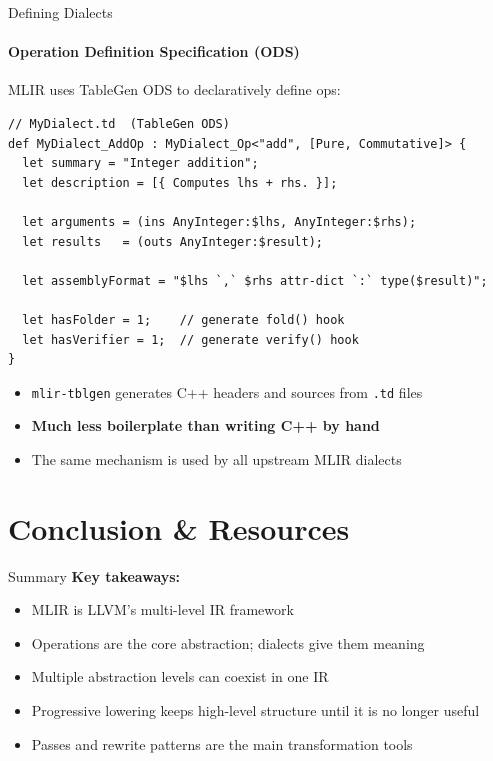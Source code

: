\begin{frame}[fragile]{Defining Dialects}
  \framesubtitle{Operation Definition Specification (ODS)}
  MLIR uses TableGen ODS to declaratively define ops:

\begin{lstlisting}[language=none,basicstyle=\ttfamily\scriptsize]
// MyDialect.td  (TableGen ODS)
def MyDialect_AddOp : MyDialect_Op<"add", [Pure, Commutative]> {
  let summary = "Integer addition";
  let description = [{ Computes lhs + rhs. }];

  let arguments = (ins AnyInteger:$lhs, AnyInteger:$rhs);
  let results   = (outs AnyInteger:$result);

  let assemblyFormat = "$lhs `,` $rhs attr-dict `:` type($result)";

  let hasFolder = 1;    // generate fold() hook
  let hasVerifier = 1;  // generate verify() hook
}
\end{lstlisting}

  \begin{itemize}
    \item \texttt{mlir-tblgen} generates C++ headers and sources from
          \texttt{.td} files
    \item \textbf{\textcolor{mainAccent}{Much less boilerplate than writing C++ by hand}}
    \item The same mechanism is used by all upstream MLIR dialects
  \end{itemize}
\end{frame}


\section{Conclusion \& Resources}


\begin{frame}{Summary}
  \textbf{Key takeaways:}
  \begin{itemize}
    \item MLIR is LLVM's multi-level IR framework
    \item Operations are the core abstraction; dialects give them meaning
    \item Multiple abstraction levels can coexist in one IR
    \item Progressive lowering keeps high-level structure until it is no longer useful
    \item Passes and rewrite patterns are the main transformation tools
  \end{itemize}
\end{frame}


